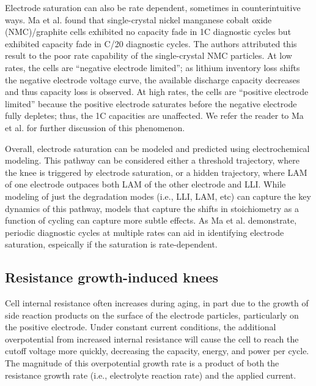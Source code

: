 \documentclass[journal=jpclcd,manuscript=article]{achemso}
\begin{document}
Electrode saturation can also be rate dependent, sometimes in counterintuitive ways. Ma et al.\cite{ma_editors_2019} found that single-crystal nickel manganese cobalt oxide (NMC)/graphite cells exhibited no capacity fade in 1C diagnostic cycles but exhibited capacity fade in C/20 diagnostic cycles. The authors attributed this result to the poor rate capability of the single-crystal NMC particles. At low rates, the cells are ``negative electrode limited''; as lithium inventory loss shifts the negative electrode voltage curve, the available discharge capacity decreases and thus capacity loss is observed. At high rates, the cells are ``positive electrode limited'' because the positive electrode saturates before the negative electrode fully depletes; thus, the 1C capacities are unaffected. We refer the reader to Ma et al.\cite{ma_editors_2019} for further discussion of this phenomenon.

Overall, electrode saturation can be modeled and predicted using electrochemical modeling. This pathway can be considered either a threshold trajectory, where the knee is triggered by electrode saturation, or a hidden trajectory, where LAM of one electrode outpaces both LAM of the other electrode and LLI. While modeling of just the degradation modes (i.e., LLI, LAM, etc) can capture the key dynamics of this pathway, models that capture the shifts in stoichiometry as a function of cycling can capture more subtle effects. As Ma et al.\cite{ma_editors_2019} demonstrate, periodic diagnostic cycles at multiple rates can aid in identifying electrode saturation, espeically if the saturation is rate-dependent.

\subsection{Resistance growth-induced knees}

Cell internal resistance often increases during aging, in part due to the growth of side reaction products on the surface of the electrode particles, particularly on the positive electrode\cite{ma_editors_2019}. Under constant current conditions, the additional overpotential from increased internal resistance will cause the cell to reach the cutoff voltage more quickly, decreasing the capacity, energy, and power per cycle. The magnitude of this overpotential growth rate is a product of both the resistance growth rate (i.e., electrolyte reaction rate) and the applied current.
\end{document}
